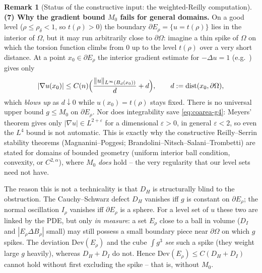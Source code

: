 \documentclass[11pt]{amsart}
\theoremstyle{definition}
\newtheorem{remark}[theorem]{Remark}
\newcommand{\Om}{\Omega}
\newcommand{\rdel}{\rho_\delta}
\newcommand{\eps}{\varepsilon}
\begin{document}
\begin{remark}[Status of the constructive input: the weighted-Reilly computation]
\medskip
\noindent\textbf{(7) Why the gradient bound \(M_0\) fails for general domains.}
On a good level (\(\rho\le\rdel<1\), so \(t(\rho)>0\)) the boundary
\(\partial E_\rho=\{u=t(\rho)\}\) lies in the interior of \(\Om\), but it may run
arbitrarily close to \(\partial\Om\): imagine a thin spike of \(\Om\) on which the
torsion function climbs from \(0\) up to the level \(t(\rho)\) over a very short
distance.  At a point \(x_0\in\partial E_\rho\) the interior gradient estimate for
\(-\Delta u=1\) (e.g.\ \cite{GilbargTrudinger2001}) gives only
\[
   |\nabla u(x_0)|\le C(n)\Bigl(\frac{\|u\|_{L^\infty(B_d(x_0))}}{d}+d\Bigr),
   \qquad d:=\operatorname{dist}(x_0,\partial\Om),
\]
which \emph{blows up} as \(d\downarrow0\) while \(u(x_0)=t(\rho)\) stays fixed.
There is no universal upper bound \(g\le M_0\) on \(\partial E_\rho\).  Nor does
integrability save \eqref{eq:coarea-g4}: Meyers' theorem gives only
\(|\nabla u|\in L^{2+\eps}\) for a dimensional \(\eps>0\), in general \(\eps<2\),
so even the \(L^4\) bound is not automatic.  This is exactly why the constructive
Reilly--Serrin stability theorems (Magnanini--Poggesi;
Brandolini--Nitsch--Salani--Trombetti) are stated for domains of bounded geometry
(uniform interior ball condition, convexity, or \(C^{2,\alpha}\)), where \(M_0\)
\emph{does} hold -- the very regularity that our level sets need not have.

The reason this is not a technicality is that \(D_H\) is structurally blind to
the obstruction.  The Cauchy--Schwarz defect \(D_H\) vanishes iff \(g\) is
constant on \(\partial E_\rho\); the normal oscillation \(I_\rho\) vanishes iff
\(\partial E_\rho\) is a sphere.  For a level set of \(u\) these two are linked by
the PDE, but only \emph{in measure}: a set \(E_\rho\) close to a ball in volume
(\(D_I\) and \(|E_\rho\Delta B_\rho|\) small) may still possess a small boundary
piece near \(\partial\Om\) on which \(g\) spikes.  The deviation
\(\mathrm{Dev}(E_\rho)\) and the cube \(\int g^3\) \emph{see} such a spike (they
weight large \(g\) heavily), whereas \(D_H+D_I\) do not.  Hence
\(\mathrm{Dev}(E_\rho)\le C(D_H+D_I)\) cannot hold without first excluding the
spike -- that is, without \(M_0\).


\end{remark}
\end{document}
